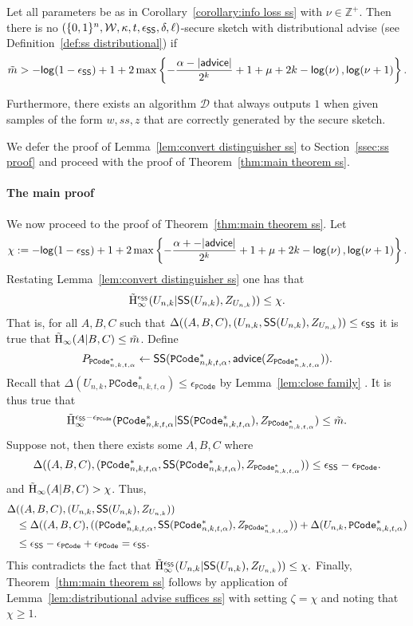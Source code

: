 \begin{lemma}
\label{lem:convert distinguisher ss}
Let all parameters be as in Corollary~\ref{corollary:info loss ss} with $\nu \in\mathbb{Z}^+$.  Then there is no $(\{0,1\}^n, \mathcal{W}, \kappa, t, \epsilon_{\mathsf{SS}}, \delta, \ell)$-secure sketch with distributional advise (see Definition~\ref{def:ss distributional}) if
\[
\tilde{m}> -\mathsf{log}\!\left(1-\epsilon_{\mathsf{SS}}\right) +1 + 2\max\left\{-\frac{\alpha-|{\mathsf{advice}}|}{2^k}+1+\mu+2k-\mathsf{log}\!\left(\nu\right), \mathsf{log}\!\left(\nu+1\right)\right\}.
\]

Furthermore, there exists an algorithm $\mathcal{D}$ that always outputs $1$ when given samples of the form $w, ss, z$ that are correctly generated by the secure sketch.
\end{lemma}

\noindent
We defer the proof of Lemma~\ref{lem:convert distinguisher ss} to Section~\ref{ssec:ss proof} and proceed with the proof of Theorem~\ref{thm:main theorem ss}.

\paragraph{The main proof}
We now proceed to the proof of Theorem~\ref{thm:main theorem ss}.   Let \[\chi:= -\mathsf{log}\!\left(1-\epsilon_{\mathsf{SS}}\right) +1 + 2\max\left\{-\frac{\alpha+-|{\mathsf{advice}}|}{2^k}+1+\mu+2k-\mathsf{log}\!\left(\nu\right), \mathsf{log}\!\left(\nu+1\right)\right\}.\]  Restating Lemma~\ref{lem:convert distinguisher ss} one has that 
\[
\tilde{\mathrm{H}}_\infty^{\epsilon_{\mathsf{SS}}}(U_{n,k} | {\mathsf{SS}}(U_{n,k}), Z_{U_{n,k}})) \le \chi.
\]
That is, for all $A, B, C$ such that $\Delta((A, B, C), (U_{n,k},{\mathsf{SS}}(U_{n,k}), Z_{U_{n,k}}))\le \epsilon_{{\mathsf{SS}}}$ it is true that $\tilde{\mathrm{H}}_\infty(A|B, C) \le \tilde{m}$.  Define \[P_{\mathtt{PCode}_{n, k, t, \alpha}^{*}}\leftarrow {\ensuremath{\mathsf{SS}}}(\mathtt{PCode}_{n, k, t, \alpha}^{*}, {\mathsf{advice}}(Z_{\mathtt{PCode}_{n, k, t, \alpha}^{*}})).\]
Recall that $\Delta(U_{n,k}, \mathtt{PCode}_{n, k, t, \alpha}^{*}) \le \epsilon_{\mathtt{PCode}}$ by Lemma~\ref{lem:close family} .  
It is thus true that 
\[
\tilde{\mathrm{H}}_\infty^{\epsilon_{{\mathsf{SS}}}-\epsilon_{\mathtt{PCode}}}(\mathtt{PCode}_{n, k, t, \alpha}^{*} | {\mathsf{SS}}(\mathtt{PCode}_{n, k, t, \alpha}^{*}), Z_{\mathtt{PCode}_{n, k, t, \alpha}^{*}})\le \tilde{m}.
\]
Suppose not, then there exists some $A, B, C$ where 
\[
\Delta((A, B, C), (\mathtt{PCode}_{n, k, t, \alpha}^{*} , {\mathsf{SS}}(\mathtt{PCode}_{n, k, t, \alpha}^{*}), Z_{\mathtt{PCode}_{n, k, t, \alpha}^{*}}))\le \epsilon_{{\mathsf{SS}}}-\epsilon_{\mathtt{PCode}}.
\]
and $\tilde{\mathrm{H}}_\infty(A|B, C)>\chi$.
Thus, 
\begin{align*}
\Delta&((A, B, C), (U_{n,k},{\mathsf{SS}}(U_{n,k}), Z_{U_{n,k}}))\\&\le \Delta((A, B, C), ((\mathtt{PCode}_{n, k, t, \alpha}^{*} , {\mathsf{SS}}(\mathtt{PCode}_{n, k, t, \alpha}^{*}), Z_{\mathtt{PCode}_{n, k, t, \alpha}^{*}}))+\Delta(U_{n,k}, \mathtt{PCode}_{n, k, t, \alpha}^{*})\\
&\le \epsilon_{{\mathsf{SS}}}-\epsilon_{\mathtt{PCode}}+ \epsilon_{\mathtt{PCode}} = \epsilon_{{\mathsf{SS}}}.
\end{align*}
This contradicts the fact that $\tilde{\mathrm{H}}_\infty^{\epsilon_{\mathsf{SS}}}(U_{n,k} | {\mathsf{SS}}(U_{n,k}), Z_{U_{n,k}})) \le \chi.$
Finally, Theorem~\ref{thm:main theorem ss} follows by application of Lemma~\ref{lem:distributional advise suffices ss} with setting $\zeta = \chi$ and noting that $\chi\ge 1$.



